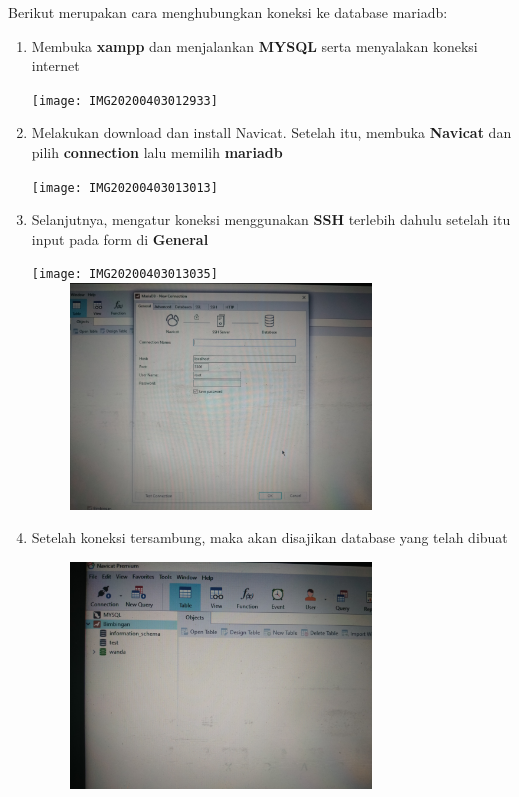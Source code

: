 \documentclass[a4paper, 12 pt]{article}
\begin{document}
		\par Berikut merupakan cara menghubungkan koneksi ke database mariadb:
		\begin{enumerate}
            \item Membuka \textbf{xampp} dan menjalankan \textbf{MYSQL} serta menyalakan koneksi internet
                \begin{center}
		        \texttt{[image: IMG20200403012933]}
	            \end{center}
            \item Melakukan download dan install Navicat. Setelah itu, membuka \textbf{Navicat} dan pilih \textbf{connection} lalu memilih \textbf{mariadb}
                \begin{center}
		        \texttt{[image: IMG20200403013013]}
	            \end{center}
            \item Selanjutnya, mengatur koneksi menggunakan \textbf{SSH} terlebih dahulu setelah itu input pada form di \textbf{General}
                \begin{center}
		        \texttt{[image: IMG20200403013035]}
		        \includegraphics[width=10cm,height=6cm]{IMG20200403013048}
	            \end{center}
            \item Setelah koneksi tersambung, maka akan disajikan database yang telah dibuat
                \begin{center}
		        \includegraphics[width=10cm,height=6cm]{IMG20200403013130}

\end{center}
\end{enumerate}
\end{document}
